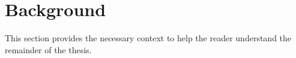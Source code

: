 \section{Background}\label{s:background}

This section provides the necessary context to help the reader understand the
remainder of the thesis.


\textcolor{lightgray}{\lipsum[16-20]}


